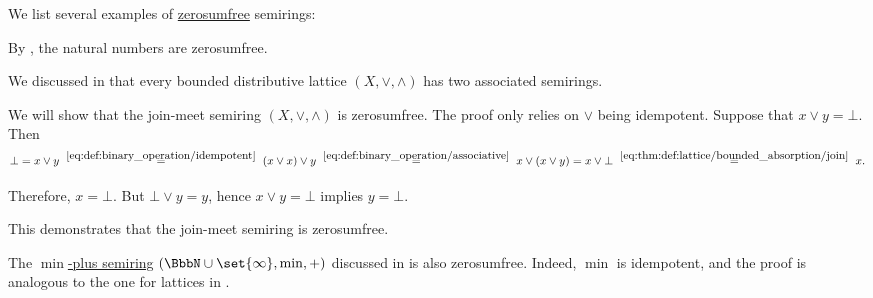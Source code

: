 \begin{example}\label{ex:def:zerosumfree}
  We list several examples of \hyperref[def:zerosumfree]{zerosumfree} semirings:
  \begin{thmenum}
     By , the natural numbers are zerosumfree.

     We discussed in  that every bounded distributive lattice \( (X, \vee, \wedge) \) has two associated semirings.

    We will show that the join-meet semiring \( (X, \vee, \wedge) \) is zerosumfree. The proof only relies on \( \vee \) being idempotent. Suppose that \( x \vee y = \bot \). Then
    \begin{equation*}
      \bot
      =
      x \vee y
      \reloset {\eqref{eq:def:binary_operation/idempotent}} =
      (x \vee x) \vee y
      \reloset {\eqref{eq:def:binary_operation/associative}} =
      x \vee (x \vee y)
      =
      x \vee \bot
      \reloset {\eqref{eq:thm:def:lattice/bounded_absorption/join}} =
      x.
    \end{equation*}

    Therefore, \( x = \bot \). But \( \bot \vee y = y \), hence \( x \vee y = \bot \) implies \( y = \bot \).

    This demonstrates that the join-meet semiring is zerosumfree.

     The \hyperref[def:tropical_semiring]{\( \min \)-plus semiring} \( (\BbbN \cup \set{ \infty }, \min, +) \) discussed in  is also zerosumfree. Indeed, \( \min \) is idempotent, and the proof is analogous to the one for lattices in .
  \end{thmenum}
\end{example}
